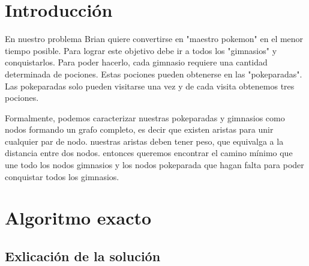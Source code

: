 \documentclass[spanish,12pt]{article}
\begin{document}
\author{Grupo  \\Alvarez Vico Jazm\'in\\Cortés Conde Titó Javier María\\Pedraza Marcelo \\ Rozenberg Uriel Jonathan}


\maketitle


\clearpage

\tableofcontents
\cleardoublepage


\section{Introducción}
En nuestro problema Brian quiere convertirse en "maestro pokemon" en el menor tiempo posible. Para lograr este objetivo debe ir a todos los "gimnasios" y conquistarlos. Para poder hacerlo, cada gimnasio requiere una cantidad determinada de pociones. Estas pociones pueden obtenerse en las "pokeparadas". Las pokeparadas solo pueden visitarse una vez y de cada visita obtenemos tres pociones.

Formalmente, podemos caracterizar nuestras pokeparadas y  gimnasios como nodos formando un grafo completo, es decir que existen aristas para unir cualquier par de nodo. nuestras aristas deben tener peso, que equivalga a la distancia entre dos nodos. entonces queremos encontrar el camino mínimo que une todo los nodos gimnasios y los nodos pokeparada que hagan falta para poder conquistar todos los gimnasios. 


\section{Algoritmo exacto}

\subsection{Exlicación de la solución}
\end{document}
